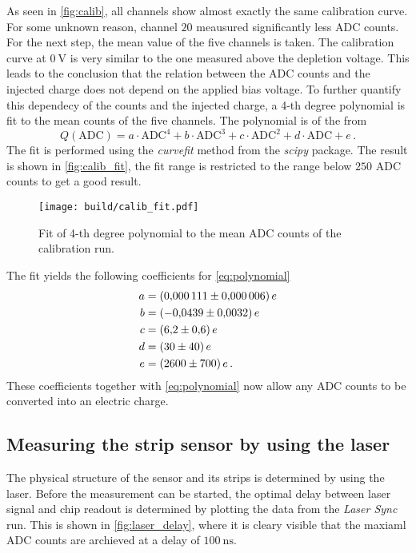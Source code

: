 As seen in \autoref{fig:calib}, all channels show almost exactly the same calibration curve.
For some unknown reason, channel $20$ meausured significantly less ADC counts.
For the next step, the mean value of the five channels is taken. The calibration curve at
$\qty{0}{\volt}$ is very similar to the one measured above the depletion voltage. This
leads to the conclusion that the relation between the ADC counts and the injected charge does not
depend on the applied bias voltage.
To further quantify this dependecy of the counts and the injected charge, a 4-th degree
polynomial is fit to the mean counts of the five channels. The polynomial is of the from
\begin{equation}
  Q(\text{ADC}) = a\cdot\text{ADC}^4 + b\cdot\text{ADC}^3 + c\cdot\text{ADC}^2 + d\cdot\text{ADC} + e \, .
  \label{eq:polynomial}
\end{equation}
The fit is performed using the \textit{curvefit} method from the \textit{scipy} \cite{scipy}
package. The result is shown in \autoref{fig:calib_fit}, the fit range is restricted to the range
below $250$ ADC counts to get a good result.

\begin{figure}[H]
  \centering
  \texttt{[image: build/calib\_fit.pdf]}
  \caption{Fit of 4-th degree polynomial to the mean ADC counts of the calibration run.}
  \label{fig:calib_fit}
\end{figure}

The fit yields the following coefficients for \eqref{eq:polynomial}
\begin{align*}
  a &= \qty{0.000111+-0.000006}{\elementarycharge} \\
  b &= \qty{-0.0439+-0.0032}{\elementarycharge} \\
  c &= \qty{6.2+-0.6}{\elementarycharge} \\
  d &= \qty{30+-40}{\elementarycharge} \\
  e &= \qty{2600+-700}{\elementarycharge} \, .
\end{align*}
These coefficients together with \eqref{eq:polynomial} now allow any ADC counts
to be converted into an electric charge.

\subsection{Measuring the strip sensor by using the laser}

The physical structure of the sensor and its strips is determined by using the laser.
Before the measurement can be started, the optimal delay between laser signal and chip readout
is determined by plotting the data from the \textit{Laser Sync} run. This is shown in
\autoref{fig:laser_delay}, where it is cleary visible that the maxiaml ADC counts are archieved at a
delay of $\qty{100}{\nano\second}$.


